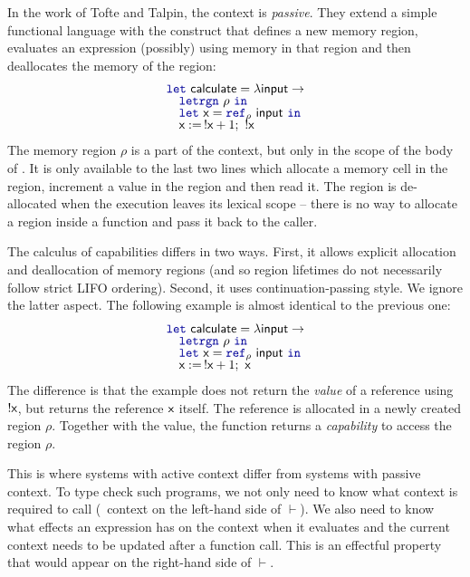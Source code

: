 In the work of Tofte and Talpin, the context is \emph{passive}. They extend a simple functional language
with the  construct that defines a new memory region, evaluates an expression (possibly)
using memory in that region and then deallocates the memory of the region:
%
\begin{equation*}
\begin{array}{l}
\kvd{let}~\ident{calculate} = \lambda \ident{input} \rightarrow\\[-0.25em]
\quad \kvd{letrgn}~\rho~\kvd{in}\\[-0.25em]
\quad \kvd{let}~\ident{x} = \kvd{ref}_\rho ~\ident{input}~\kvd{in}\\[-0.25em]
\quad \ident{x} :=\, !\ident{x} + 1;~ !\ident{x}
\end{array}
\end{equation*}
%
The memory region $\rho$ is a part of the context, but only in the scope of the body of
. It is only available to the last two lines which allocate a memory cell in the region,
increment a value in the region and then read it. The region is de-allocated when the execution
leaves its lexical scope -- there is no way to allocate a region inside a function and pass it back
to the caller.

The calculus of capabilities differs in two ways. First, it allows explicit allocation and deallocation
of memory regions (and so region lifetimes do not necessarily follow strict LIFO ordering). Second,
it uses continuation-passing style. We ignore the latter aspect. The following example is almost
identical to the previous one:
%
\begin{equation*}
\begin{array}{l}
\kvd{let}~\ident{calculate} = \lambda \ident{input} \rightarrow\\[-0.25em]
\quad \kvd{letrgn}~\rho~\kvd{in}\\[-0.25em]
\quad \kvd{let}~\ident{x} = \kvd{ref}_\rho ~\ident{input}~\kvd{in}\\[-0.25em]
\quad \ident{x} :=\, !\ident{x} + 1;~ \ident{x}
\end{array}
\end{equation*}
%
The difference is that the example does not return the \emph{value} of a reference using
$!\textnormal{\sffamily x}$, but returns the reference $\textnormal{\sffamily x}$ itself. The reference is allocated in a newly
created region $\rho$. Together with the value, the function returns a \emph{capability} to access
the region $\rho$.

This is where systems with active context differ from systems with passive context. To type check
such programs, we not only need to know what context is required to call 
(\ie~context on the left-hand side of $\vdash$). We also need to know what effects an expression
has on the context when it evaluates and the current context needs to be updated after a function
call. This is an effectful property that would appear on the right-hand side of $\vdash$.


